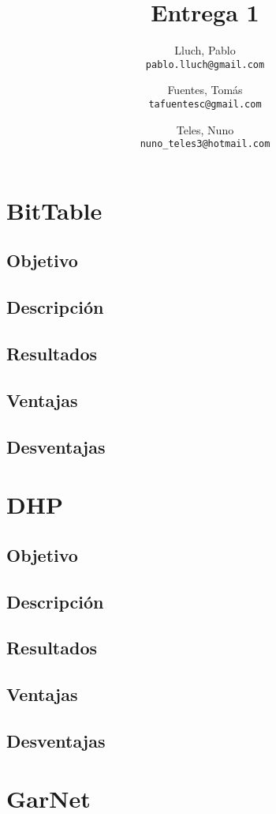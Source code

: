 \documentclass[12pt,spanish]{article}
\title{Entrega 1}
\author{
  Lluch, Pablo\\
  \texttt{pablo.lluch@gmail.com}
  \and
  Fuentes, Tomás\\
  \texttt{tafuentesc@gmail.com}
  \and
  Teles, Nuno\\
  \texttt{nuno\_teles3@hotmail.com}
}
\begin{document}
\maketitle
\newpage

\section{BitTable}

\subsection{Objetivo}
\subsection{Descripción}
\subsection{Resultados}
\subsection{Ventajas}
\subsection{Desventajas}

\section{DHP}

\subsection{Objetivo}
\subsection{Descripción}
\subsection{Resultados}
\subsection{Ventajas}
\subsection{Desventajas}

\section{GarNet}
\end{document}
